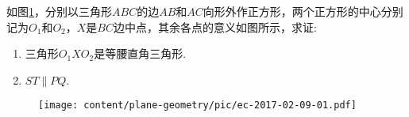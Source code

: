 \begin{exercise}
  \label{ec:2017-02-09-01}
  如图\ref{fig:2017-02-09-01-01}，分别以三角形$ABC$的边$AB$和$AC$向形外作正方形，两个正方形的中心分别记为$O_{1}$和$O_{2}$，$X$是$BC$边中点，其余各点的意义如图所示，求证:
  \begin{enumerate}
  \item 三角形$O_{1}XO_{2}$是等腰直角三角形.
  \item $ST \parallel PQ$.
  \end{enumerate}
\end{exercise}

\begin{figure}[htbp]
  \centering
\texttt{[image: content/plane-geometry/pic/ec-2017-02-09-01.pdf]}
\caption{}
\label{fig:2017-02-09-01-01}
\end{figure}
  
